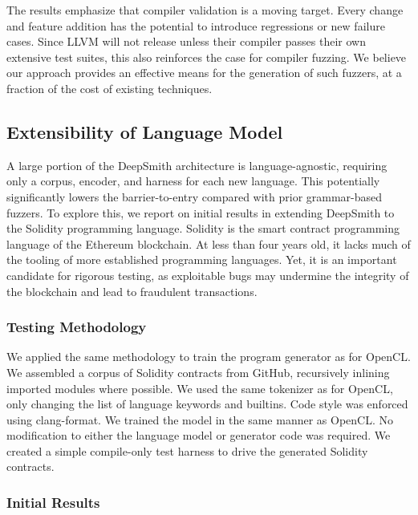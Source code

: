 The results emphasize that compiler validation is a moving target. Every change
and feature addition has the potential to introduce regressions or new failure
cases. Since LLVM will not release unless their compiler passes their own
extensive test suites, this also reinforces the case for compiler fuzzing. We
believe our approach provides an effective means for the generation of such
fuzzers, at a fraction of the cost of existing techniques.


\subsection{Extensibility of Language Model}



A large portion of the DeepSmith architecture is language-agnostic, requiring
only a corpus, encoder, and harness for each new language. This potentially
significantly lowers the barrier-to-entry compared with prior grammar-based
fuzzers. To explore this, we report on initial results in extending DeepSmith to
the Solidity programming language. Solidity is the smart contract programming
language of the Ethereum blockchain. At less than four years old, it lacks much
of the tooling of more established programming languages. Yet, it is an
important candidate for rigorous testing, as exploitable bugs may undermine the
integrity of the blockchain and lead to fraudulent transactions.

\subsubsection{Testing Methodology}

We applied the same methodology to train the program generator as for OpenCL. We
assembled a corpus of Solidity contracts from GitHub, recursively inlining
imported modules where possible. We used the same tokenizer as for OpenCL, only
changing the list of language keywords and builtins. Code style was enforced
using clang-format. We trained the model in the same manner as OpenCL. No
modification to either the language model or generator code was required. We
created a simple compile-only test harness to drive the generated Solidity
contracts.

\subsubsection{Initial Results}

